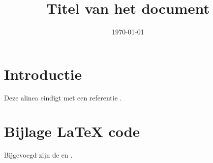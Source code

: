 \documentclass{uva-inf-article}
\title{Titel van het document}
\date{\today}
\begin{document}
\maketitle




\section{Introductie}
\lipsum[1][1-3] 
Deze alinea eindigt met een referentie \parencite{vanwijk21}.
\lipsum[2-3]

%
\printbibliography

%
\appendix 
\section{Bijlage {\LaTeX} code}
Bijgevoegd zijn de  en 
.

\end{document}
